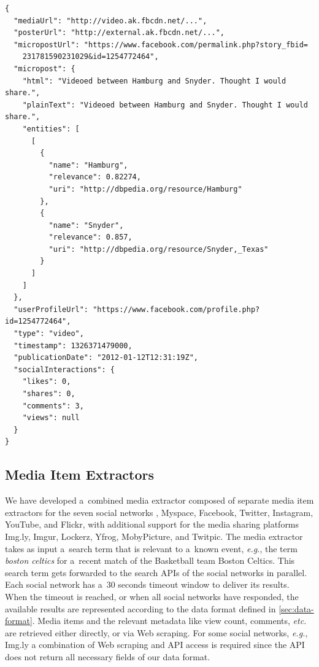 \begin{lstlisting}[caption={Sample output of the media extractor
  showing a~Facebook post processed with named entity extraction
  and disambiguation (slightly edited for legibility).},
  label={code:facebook}]
{
  "mediaUrl": "http://video.ak.fbcdn.net/...",
  "posterUrl": "http://external.ak.fbcdn.net/...",
  "micropostUrl": "https://www.facebook.com/permalink.php?story_fbid=
    231781590231029&id=1254772464",
  "micropost": {
    "html": "Videoed between Hamburg and Snyder. Thought I would share.",
    "plainText": "Videoed between Hamburg and Snyder. Thought I would share.",
    "entities": [
      [
        {
          "name": "Hamburg",
          "relevance": 0.82274,
          "uri": "http://dbpedia.org/resource/Hamburg"
        },
        {
          "name": "Snyder",
          "relevance": 0.857,
          "uri": "http://dbpedia.org/resource/Snyder,_Texas"
        }
      ]
    ]
  },
  "userProfileUrl": "https://www.facebook.com/profile.php?id=1254772464",
  "type": "video",
  "timestamp": 1326371479000,
  "publicationDate": "2012-01-12T12:31:19Z",
  "socialInteractions": {
    "likes": 0,
    "shares": 0,
    "comments": 3,
    "views": null
  }
}
\end{lstlisting}

\subsection{Media Item Extractors}
\label{sec:media-item-extractors}

We have developed a~combined media extractor composed of
separate media item extractors for the seven social networks
\googleplus, Myspace, Facebook, Twitter, Instagram, YouTube,
and Flickr, with additional support for the media sharing
platforms Img.ly, Imgur, Lockerz, Yfrog, MobyPicture, and Twitpic.
The media extractor takes as input a~search term that is relevant
to a~known event, \emph{e.g.}, the term \emph{boston celtics}
for a~recent match of the Basketball team Boston Celtics.
This search term gets forwarded to the search APIs
of the social networks in parallel.
Each social network has a~30 seconds timeout window
to deliver its results.
When the timeout is reached,
or when all social networks have responded,
the available results are represented according to the data format
defined in \autoref{sec:data-format}.
Media items and the relevant metadata like view count, comments,
\emph{etc.} are retrieved either directly, or via Web scraping.
For some social networks, \emph{e.g.}, Img.ly
a combination of Web scraping and API access is required
since the API does not return all necessary fields
of our data format.

